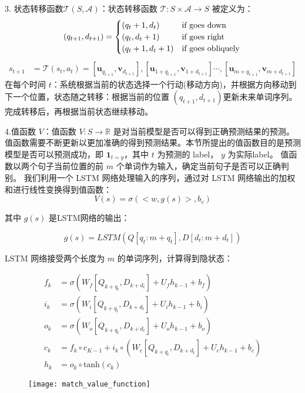 3. 状态转移函数$\mathcal{T}(S,\mathcal{A})$：状态转移函数 $\mathcal{T}:S\times \mathcal{A}\rightarrow S$ 被定义为：
$$
(q_{t+1}, d_{t+1}) =
\begin{cases}
(q_{t} + 1, d_{t}) &\text{if goes down} \\
(q_{t}, d_{t} + 1) &\text{if goes right}  \\
(q_{t} + 1, d_{t} + 1) &\text{if goes obliquely}
\end{cases} \\
$$
$$
\begin{aligned}
s_{t+1} &= \mathcal{T}(s_t, a_t) = [\mathbf{u}_{q_{t+1}}, \mathbf{v}_{d_{t+1}}], [\mathbf{u}_{1+q_{t+1}},\mathbf{v}_{1+d_{t+1}}] \cdots, [\mathbf{u}_{m+q_{t+1}}, \mathbf{v}_{m+d_{t+1}}]
\end{aligned}
$$
在每个时间 $t$：系统根据当前的状态选择一个行动(移动方向)，并根据方向移动到下一个位置，状态随之转移：根据当前的位置 $(q_{t+1}, d_{t+1}) $更新未来单词序列。完成转移后，再根据当前状态继续移动。

4.值函数 $V$：值函数 $V: S\rightarrow \mathbb{R}$ 是对当前模型是否可以得到正确预测结果的预测。值函数需要不断更新以更加准确的得到预测结果。本节所提出的值函数目的是预测模型是否可以预测成功，即 $\mathbf{1}_{t=y}$，其中 $t$ 为预测的 label， $y$ 为实际label。 值函数以两个句子当前位置的前 $m$ 个单词作为输入，确定当前句子是否可以正确判别。
我们利用一个 LSTM 网络处理输入的序列，通过对 LSTM 网络输出的加权和进行线性变换得到值函数：
$$
V(s) = \sigma(<w, g(s)>, b_v)
$$

其中 $g(s)$ 是LSTM网络的输出：

$$
g(s) = LSTM(Q[q_{t}:m+q_{t}], D [d_{t}:m+d_{t}])
$$

LSTM 网络接受两个长度为 $m$ 的单词序列，计算得到隐状态：

\begin{equation}
\label{eq:LSTM}
\begin{aligned}
f_k &= \sigma(W_f[Q_{k+q_{t}}, D_{k+d_{t}}] + U_fh_{k-1} + b_f) \\
i_k &= \sigma(W_i[Q_{k+q_{t}}, D_{k+d_{t}}] + U_ih_{k-1} + b_i) \\
o_k &= \sigma(W_o[Q_{k+q_{t}}, D_{k+d_{t}}] + U_oh_{k-1} + b_o) \\
c_k &= f_k \circ c_{K-1} + i_k \circ (W_c[Q_{k+q_{t}}, D_{k+d_{t}}] + U_ch_{k-1}+b_c) \\
h_k &= o_k \circ \text{tanh}(c_k)
\end{aligned}
\end{equation}

\begin{figure}[!htbp]
    \centering
    \texttt{[image: match\_value\_function]}
    \label{fig:value_function_input}
\end{figure}

